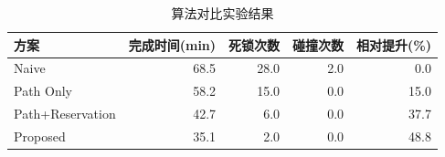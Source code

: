 \begin{table}[htbp]
\centering
\caption{算法对比实验结果}
\label{tab:comparison}
\begin{tabular}{lrrrr}
\toprule
方案 & 完成时间(min) & 死锁次数 & 碰撞次数 & 相对提升(\%) \\
\midrule
Naive & 68.5 & 28.0 & 2.0 & 0.0 \\
Path Only & 58.2 & 15.0 & 0.0 & 15.0 \\
Path+Reservation & 42.7 & 6.0 & 0.0 & 37.7 \\
Proposed & 35.1 & 2.0 & 0.0 & 48.8 \\
\bottomrule
\end{tabular}
\end{table}
